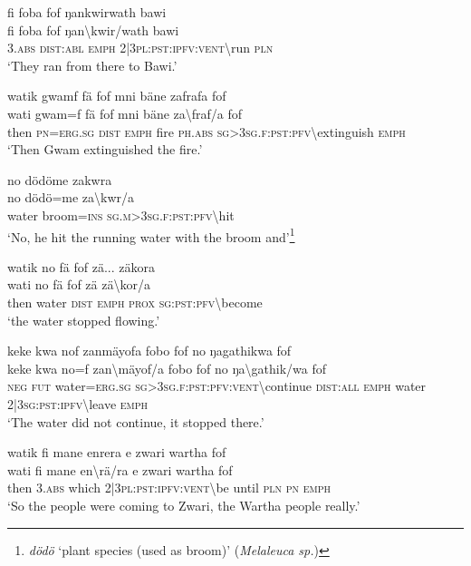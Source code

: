 \ea\label{ex:1:a3601}
fi foba fof ŋankwirwath bawi\\
\gll fi	foba	fof	ŋan{\textbackslash}kwir/wath	bawi\\
     3.\textsc{abs}	\textsc{dist}:\textsc{abl}	\textsc{emph}	2|3\textsc{pl}:\textsc{pst}:\textsc{ipfv}:\textsc{vent}{\textbackslash}run	\textsc{pln}\\
\glt `They ran from there to Bawi.'
\z

\ea\label{ex:1:a3603}
watik gwamf fä fof mni bäne zafrafa fof\\
\gll wati	gwam=f	fä	fof	mni	bäne	za{\textbackslash}fraf/a	fof\\
     then	\textsc{pn}=\textsc{erg}.\textsc{sg}	\textsc{dist}	\textsc{emph}	fire	\textsc{ph}.\textsc{abs}	\textsc{sg}>3\textsc{sg}.\textsc{f}:\textsc{pst}:\textsc{pfv}{\textbackslash}extinguish	\textsc{emph}\\
\glt `Then Gwam extinguished the fire.'
\z

\ea\label{ex:1:a3605}
no dödöme zakwra\\
\gll no	dödö=me	za{\textbackslash}kwr/a\\
     water	broom=\textsc{ins}	\textsc{sg}.\textsc{m}>3\textsc{sg}.\textsc{f}:\textsc{pst}:\textsc{pfv}{\textbackslash}hit\\
\glt `No, he hit the running water with the broom and'\footnote{\textit{dödö} `plant species (used as broom)' (\textit{Melaleuca sp.})}
\z

\ea\label{ex:1:a3607}
watik no fä fof zä... zäkora\\
\gll wati	no	fä	fof	zä	zä{\textbackslash}kor/a\\
     then	water	\textsc{dist}	\textsc{emph}	\textsc{prox}	\textsc{sg}:\textsc{pst}:\textsc{pfv}{\textbackslash}become\\
\glt `the water stopped flowing.'
\z

\ea\label{ex:1:a3608}
keke kwa nof zanmäyofa fobo fof no ŋagathikwa fof\\
\gll keke	kwa	no=f	zan{\textbackslash}mäyof/a	fobo	fof	no	ŋa{\textbackslash}gathik/wa	fof\\
     \textsc{neg}	\textsc{fut}	water=\textsc{erg}.\textsc{sg}	\textsc{sg}>3\textsc{sg}.\textsc{f}:\textsc{pst}:\textsc{pfv}:\textsc{vent}{\textbackslash}continue	\textsc{dist}:\textsc{all}	\textsc{emph}	water	2|3\textsc{sg}:\textsc{pst}:\textsc{ipfv}{\textbackslash}leave	\textsc{emph}\\
\glt `The water did not continue, it stopped there.'
\z

\ea\label{ex:1:a3610}
watik fi mane enrera  e zwari wartha fof\\
\gll wati	fi	mane	en{\textbackslash}rä/ra	e	zwari	wartha	fof\\
     then	3.\textsc{abs}	which	2|3\textsc{pl}:\textsc{pst}:\textsc{ipfv}:\textsc{vent}{\textbackslash}be	until	\textsc{pln}	\textsc{pn}	\textsc{emph}\\
\glt `So the people were coming to Zwari, the Wartha people really.'
\z


